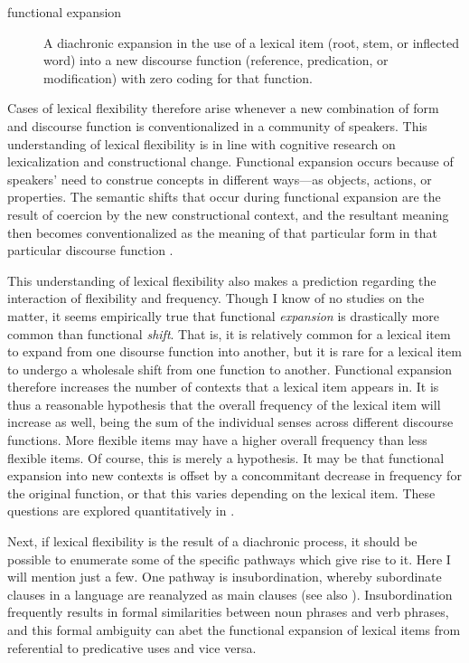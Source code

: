 \begin{description}
  \item[functional expansion] A diachronic expansion in the use of a lexical item (root, stem, or inflected word) into a new discourse function (reference, predication, or modification) with zero coding for that function.
\end{description}

\noindent Cases of lexical flexibility therefore arise whenever a new combination of form and discourse function is conventionalized in a community of speakers. This understanding of lexical flexibility is in line with cognitive research on lexicalization and constructional change. Functional expansion occurs because of speakers' need to construe concepts in different ways—as objects, actions, or properties. The semantic shifts that occur during functional expansion are the result of coercion by the new constructional context, and the resultant meaning then becomes conventionalized as the meaning of that particular form in that particular discourse function \parencite[108]{Croft1991}.

This understanding of lexical flexibility also makes a prediction regarding the interaction of flexibility and frequency. Though I know of no studies on the matter, it seems empirically true that functional \emph{expansion} is drastically more common than functional \emph{shift}. That is, it is relatively common for a lexical item to expand from one disourse function into another, but it is rare for a lexical item to undergo a wholesale shift from one function to another. Functional expansion therefore increases the number of contexts that a lexical item appears in. It is thus a reasonable hypothesis that the overall frequency of the lexical item will increase as well, being the sum of the individual senses across different discourse functions. More flexible items may have a higher overall frequency than less flexible items. Of course, this is merely a hypothesis. It may be that functional expansion into new contexts is offset by a concommitant decrease in frequency for the original function, or that this varies depending on the lexical item. These questions are explored quantitatively in .

Next, if lexical flexibility is the result of a diachronic process, it should be possible to enumerate some of the specific pathways which give rise to it. Here I will mention just a few. One pathway is insubordination, whereby subordinate clauses in a language are reanalyzed as main clauses \parencites{Evans2007}{Mithun2008}{EvansWatanabe2016} (see also ). Insubordination frequently results in formal similarities between noun phrases and verb phrases, and this formal ambiguity can abet the functional expansion of lexical items from referential to predicative uses and vice versa.

